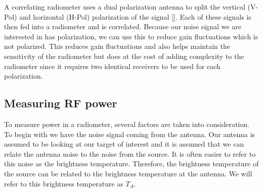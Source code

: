 A correlating radiometer uses a dual polarization antenna to split the vertical (V-Pol) and horizontal (H-Pol) polarization of the signal [\cite{Fujimoto}].  Each of these signals is then fed into a radiometer and is correlated.  Because our noise signal we are interested in has polarization, we can use this to reduce gain fluctuations which is not polarized.  This reduces gain fluctuations and also helps maintain the sensitivity of the radiometer but does at the cost of adding complexity to the radiometer since it requires two identical receivers to be used for each polarization.  


\subsection{Measuring RF power}

To measure power in a radiometer, several factors are taken into consideration.  To begin with we have the noise signal coming from the antenna.  Our antenna is assumed to be looking at our target of interest and it is assumed that we can relate the antenna noise to the noise from the source.  It is often easier to refer to this noise as the brightness temperature.  Therefore, the brightness temperature of the source can be related to the brightness temperature at the antenna.  We will refer to this brightness temperature as $T_{A}$.  



